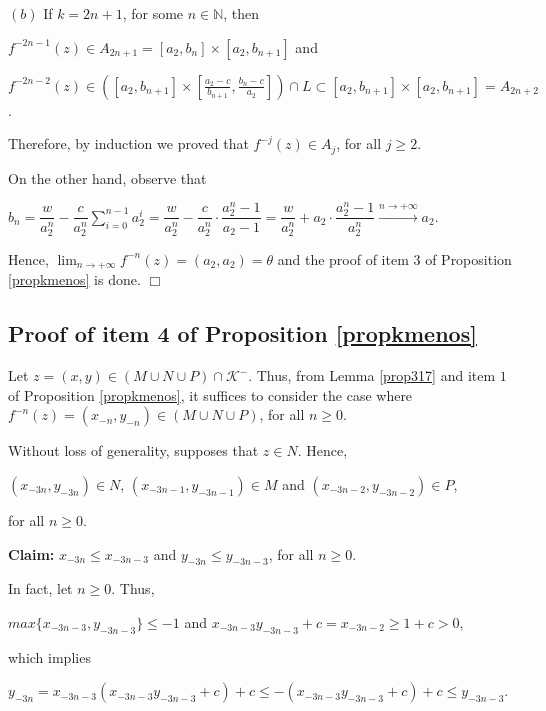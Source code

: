 \documentclass[11pt]{amsart}
\theoremstyle{definition}
\begin{document}
$(b)$ If $k=2n+1$, for some $n\in\mathbb{N}$, then

\smallskip

\noindent $f^{-2n-1}(z)\in A_{2n+1}=[a_2,b_{n}]\times[ a_2,b_{n+1}]$ and 

\noindent $ f^{-2n-2}(z)\in\left(\left[a_2,b_{n+1}\right]\times\left[ \frac{a_2-c}{b_{n+1}},\frac{b_{n}-c}{a_2}\right]\right)\cap L
 \subset [a_2,b_{n+1}]\times [ a_2,b_{n+1}]=A_{2n+2}$.


Therefore, by induction we proved that $f^{-j}(z)\in A_j$, for all $j\geq 2$.

On the other hand, observe that
\begin{center}
	$b_n= \dfrac{w}{a_2^n}-\dfrac{c}{a_2^n}\displaystyle\sum_{i=0}^{n-1}a_2^i=\dfrac{w}{a_2^n}-\dfrac{c}{a_2^n}\cdot \dfrac{a_2^n-1}{a_2-1} =\dfrac{w}{a_2^n}+a_2\cdot\dfrac{a_2^n-1}{a_2^n}\xrightarrow{n\to+\infty} a_2$.
\end{center}
Hence, $\displaystyle\lim_{n\to+\infty}f^{-n}(z)=(a_2,a_2)=\theta$ and the proof of item $3$ of Proposition \ref{propkmenos} is done. \hfill $\Box$



\subsection{Proof of item 4 of Proposition \ref{propkmenos}} \label{quatropropkmenos}
 Let $z=(x,y)\in (M\cup N\cup P)\cap \mathcal{K}^-$. Thus, from Lemma \ref{prop317} and 
item $1$ of Proposition \ref{propkmenos}, it suffices to consider the case where $f^{-n}(z)=(x_{-n},y_{-n})\in(M\cup N\cup P)$, for all $n\geq 0$.
	
	Without loss of generality, supposes that $z\in N$. Hence,
	\begin{center}
$(x_{-3n},y_{-3n})\in N$, $(x_{-3n-1},y_{-3n-1})\in M$ and $(x_{-3n-2},y_{-3n-2})\in P$,
	\end{center}
	\noindent for all $n\geq 0$.
	
	\noindent \textbf{Claim:} $x_{-3n}\leq x_{-3n-3}$ and $y_{-3n}\leq y_{-3n-3}$, for all $n\geq 0$.
	
	In fact, let $n\geq 0$. Thus,
\begin{center}
$max\{x_{-3n-3},y_{-3n-3}\}\leq-1$ and $x_{-3n-3}y_{-3n-3}+c=x_{-3n-2}\geq 1+c>0$, 
\end{center}	
which implies
\begin{center}
$y_{-3n}=x_{-3n-3}(x_{-3n-3}y_{-3n-3}+c)+c\leq -(x_{-3n-3}y_{-3n-3}+c)+c\leq y_{-3n-3}$.
\end{center}
\end{document}
